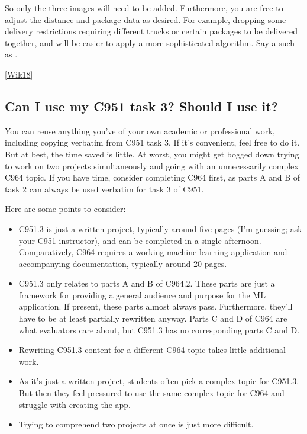 \documentclass[letterpaper,10pt,english]{jupyterBook}
\begin{document}
\sphinxAtStartPar
So only the three images will need to be added. Furthermore, you are free to adjust the distance and package data as desired. For example, dropping some delivery restrictions requiring different trucks or certain packages to be delivered together, and will be easier to apply a more sophisticated algorithm. Say a  such as .



\sphinxAtStartPar
{[}\hyperlink{cite.resources:id2}{Wik18}{]}


\subsection{Can I use my C951 task 3? Should I use it?}
\label{\detokenize{task1:can-i-use-my-c951-task-3-should-i-use-it}}
\sphinxAtStartPar
You can reuse anything you’ve of your own academic or professional work, including copying verbatim from C951 task 3. If it’s convenient, feel free to do it. But at best, the time saved is little. At worst, you might get bogged down trying to work on two projects simultaneously and going with an unnecessarily complex C964 topic. If you have time, consider completing C964 first, as parts A and B of task 2 can always be used verbatim for task 3 of C951.

\sphinxAtStartPar
Here are some points to consider:
\begin{itemize}
\item {} 
\sphinxAtStartPar
C951.3 is just a written project, typically around five pages (I’m guessing; ask your C951 instructor), and can be completed in a single afternoon. Comparatively, C964 requires a working machine learning application and accompanying documentation, typically around 20 pages.

\item {} 
\sphinxAtStartPar
C951.3 only relates to parts A and B of C964.2. These parts are just a framework for providing a general audience and purpose for the ML application. If present, these parts almost always pass. Furthermore, they’ll have to be at least partially rewritten anyway. Parts C and D of C964 are what evaluators care about, but C951.3 has no corresponding parts C and D.

\item {} 
\sphinxAtStartPar
Rewriting C951.3 content for a different C964 topic takes little additional work.

\item {} 
\sphinxAtStartPar
As it’s just a written project, students often pick a complex topic for C951.3. But then they feel pressured to use the same complex topic for C964 and struggle with creating the app.

\item {} 
\sphinxAtStartPar
Trying to comprehend two projects at once is just more difficult.

\end{itemize}
\end{document}
